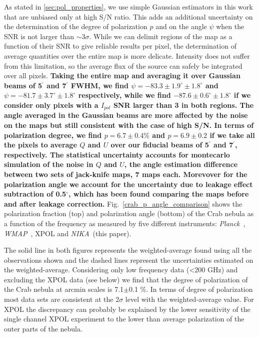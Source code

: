\documentclass[twocolumn,traditabstract]{aa}
\def\NIKA{\textit{NIKA}}
\def\Planck{\textit{Planck}}
\def\WMAP{\textit{WMAP}}
\begin{document}
As stated in \ref{sec:pol_properties}, we use simple Gaussian
  estimators in this work that are unbiased only at high S/N ratio. This adds an
  additional uncertainty on the determination of the degree of polarization $p$
  and on the angle $\psi$ when the SNR is not larger than $\sim 3\sigma$. While
  we can delimit regions of the map as a function of their SNR to give reliable
  results per pixel, the determination of average quantities over the entire map
  is more delicate. Intensity does not suffer from this limitation, so the
  average flux of the source can safely be integrated over all pixels. \textbf{Taking
  the entire map and averaging it over Gaussian beams of 5$^{\prime}$ and
  7$^{\prime}$ FWHM, we find $\psi = -83.3 \pm 1.9^{\circ} \pm 1.8^{\circ}$ and $\psi =
  -81.7 \pm 3.7^{\circ} \pm 1.8^{\circ}$ respectively, while we find $-87.6 \pm 0.6^{\circ} \pm 1.8^{\circ}$ 
  if we consider only pixels with a $I_{pol}$ SNR larger than
  3 in both regions.
  The angle averaged in the Gaussian beams are more affected by the noise on the maps but still consistent with the case of high S/N. 
  In terms of polarization degree, we find $p = 6.7 \pm 0.4 \%$	
  and $p = 6.9 \pm 0.2$ if we take all the pixels to average $Q$
  and $U$ over our fiducial beams of 5$^{\prime}$ and 7$^{\prime}$,
  respectively. The statistical uncertainty accounts for montecarlo simulation of the noise in $Q$ and $U$, the angle estimation difference between two sets of jack-knife maps, 7 maps each.
  Morevover for the polarization angle we account for the uncertainty due to leakage effect subtraction of 0.5$^{\circ}$, which has been found comparing the maps before and after leakage correction.}
Fig.~\ref{crab_p_angle_comparison} shows the polarization fraction (top) and polarization angle (bottom) of the Crab nebula as a function of the frequency as measured by
five different instruments: \Planck\ \citep{2015arXiv150702058P},
\WMAP\ \citep{2011ApJS..192...19W}, XPOL \citep{aumont2010} and \NIKA\ (this paper).  

The solid line in both figures represents the weighted-average found using all
the observations shown and the dashed lines represent the uncertainties
estimated on the weighted-average. Considering only low frequency data
(\textless 200 GHz) and excluding the XPOL data (see below) we find that the
degree of polarization of the Crab nebula at arcmin scales is 7.1$\pm$0.1 \%.
In terms of degree of polarization most data sets are consistent at the
2$\sigma$ level with the weighted-average value. For XPOL the discrepancy can
probably be explained by the lower sensitivity of the single channel XPOL
experiment to the lower than average polarization of the outer parts of the
nebula.
\end{document}
